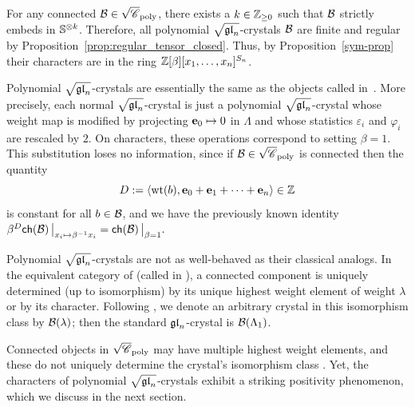 \documentclass[11pt]{article}
\begin{document}
For any connected $\mathcal{B} \in \sqrt{\mathscr{C}}_{\operatorname{poly}}$, there exists a $k \in \mathbb{Z}_{\geq 0}$ such that $\mathcal{B}$ strictly embeds in $\mathbb{S}^{\otimes k}$.
Therefore, all polynomial $\sqrt{\mathfrak{gl}_n}$-crystals $\mathcal{B}$ are finite and regular by Proposition~\ref{prop:regular_tensor_closed}.
Thus, by Proposition~\ref{sym-prop} their characters are in the  ring  $\mathbb{Z}[\beta][x_1, \dotsc, x_n]^{S_n}$.
 

\begin{remark}\label{no-loss-rem}
Polynomial $\sqrt{\mathfrak{gl}_n}$-crystals are essentially the same as the objects called  in~\cite{MT2023,MTY}.
More precisely, each normal $\sqrt{\mathfrak{gl}_n}$-crystal is just a polynomial $\sqrt{\mathfrak{gl}_n}$-crystal whose weight map is modified by projecting $\textbf{e}_0 \mapsto 0$ in $\Lambda$ and whose statistics $\varepsilon_i$ and $\varphi_i$ are rescaled by $2$.
On characters, these operations correspond to setting $\beta = 1$.
This substitution loses no information, since if $\mathcal{B} \in \sqrt{\mathscr{C}}_{\operatorname{poly}}$ is connected then the quantity
\[
D := \langle \operatorname{wt}(b), \textbf{e}_0 + \textbf{e}_1 + \cdots + \textbf{e}_n \rangle \in \mathbb{Z}
\]
is constant for all $b \in \mathcal{B}$, and we have the previously known identity
$
\beta^{D} \mathsf{ch}(\mathcal{B}) \, \bigr\rvert_{x_i \mapsto \beta^{-1} x_i} = \mathsf{ch}(\mathcal{B}) \, \bigr\rvert_{\beta = 1}.
$
\end{remark}

Polynomial $\sqrt{\mathfrak{gl}_n}$-crystals are not as well-behaved as their classical analogs.
In the equivalent category of  (called  in \cite{BumpSchilling}), a connected component is uniquely determined (up to isomorphism) by its unique highest weight element of weight $\lambda$ or by its character.
Following \cite{Kashiwara90,Kashiwara91}, we denote an arbitrary crystal in this isomorphism class by $\mathcal{B}(\lambda)$; then the standard $\mathfrak{gl}_n$-crystal is $\mathcal{B}(\Lambda_1)$.

Connected objects in $ \sqrt{\mathscr{C}}_{\operatorname{poly}}$ may have multiple highest weight elements, and these do not uniquely determine the crystal's isomorphism class \cite{MT2023,MTY}.
Yet, the characters of polynomial $\sqrt{\mathfrak{gl}_n}$-crystals exhibit a striking positivity phenomenon, which we discuss in the next section.
\end{document}
